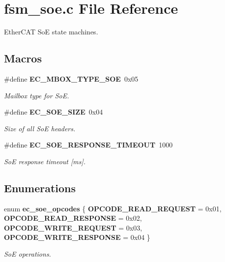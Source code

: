 \section{fsm\-\_\-soe.\-c File Reference}
\label{fsm__soe_8c}


Ether\-C\-A\-T So\-E state machines.  


\subsection*{Macros}
\begin{DoxyCompactItemize}
\item 
\#define {\bf E\-C\-\_\-\-M\-B\-O\-X\-\_\-\-T\-Y\-P\-E\-\_\-\-S\-O\-E}~0x05\label{fsm__soe_8c_ab02cafd2881eb57c288e078ea57736d5}

\begin{DoxyCompactList}\small\item\em Mailbox type for So\-E. \end{DoxyCompactList}\item 
\#define {\bf E\-C\-\_\-\-S\-O\-E\-\_\-\-S\-I\-Z\-E}~0x04\label{fsm__soe_8c_add5bad0251925ce1779bc0d3e186f547}

\begin{DoxyCompactList}\small\item\em Size of all So\-E headers. \end{DoxyCompactList}\item 
\#define {\bf E\-C\-\_\-\-S\-O\-E\-\_\-\-R\-E\-S\-P\-O\-N\-S\-E\-\_\-\-T\-I\-M\-E\-O\-U\-T}~1000\label{fsm__soe_8c_a2e9892fef5e41058583eafca62b7708b}

\begin{DoxyCompactList}\small\item\em So\-E response timeout [ms]. \end{DoxyCompactList}\end{DoxyCompactItemize}
\subsection*{Enumerations}
\begin{DoxyCompactItemize}
\item 
enum {\bf ec\-\_\-soe\-\_\-opcodes} \{ {\bf O\-P\-C\-O\-D\-E\-\_\-\-R\-E\-A\-D\-\_\-\-R\-E\-Q\-U\-E\-S\-T} =  0x01, 
{\bf O\-P\-C\-O\-D\-E\-\_\-\-R\-E\-A\-D\-\_\-\-R\-E\-S\-P\-O\-N\-S\-E} =  0x02, 
{\bf O\-P\-C\-O\-D\-E\-\_\-\-W\-R\-I\-T\-E\-\_\-\-R\-E\-Q\-U\-E\-S\-T} =  0x03, 
{\bf O\-P\-C\-O\-D\-E\-\_\-\-W\-R\-I\-T\-E\-\_\-\-R\-E\-S\-P\-O\-N\-S\-E} =  0x04
 \}
\begin{DoxyCompactList}\small\item\em So\-E operations. \end{DoxyCompactList}\end{DoxyCompactItemize}
